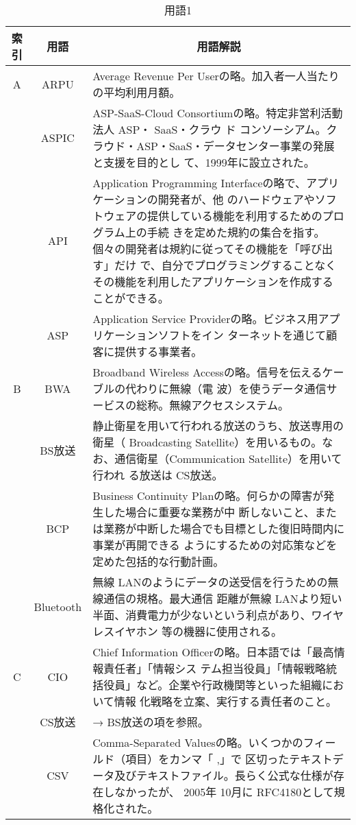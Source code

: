 \begin{table}[htb]
  \begin{center}
    \caption{用語1}
    \begin{tabular}{|c|c|p{12cm}|}
      \hline
      索引 & 用語 & \multicolumn{1}{c|}{用語解説} \\
      \hline
      A &  ARPU & Average Revenue Per Userの略。加入者一人当たりの平均利用月額。\\
      \cline{2-3}
      & ASPIC & ASP-SaaS-Cloud Consortiumの略。特定非営利活動法人 ASP・ SaaS・クラウ
      ド コンソーシアム。クラウド・ASP・SaaS・データセンター事業の発展と支援を目的とし
      て、1999年に設立された。 
      \\
      \cline{2-3}
      & API & Application Programming Interfaceの略で、アプリケーションの開発者が、他
      のハードウェアやソフトウェアの提供している機能を利用するためのプログラム上の手続
      きを定めた規約の集合を指す。個々の開発者は規約に従ってその機能を「呼び出す」だけ
      で、自分でプログラミングすることなくその機能を利用したアプリケーションを作成する
      ことができる。 \\
      \cline{2-3}
      & ASP & Application Service Providerの略。ビジネス用アプリケーションソフトをイン
      ターネットを通じて顧客に提供する事業者。 \\
      \hline
      B & BWA & Broadband Wireless Accessの略。信号を伝えるケーブルの代わりに無線（電
        波）を使うデータ通信サービスの総称。無線アクセスシステム。 \\
      \cline{2-3}
      & BS放送 & 静止衛星を用いて行われる放送のうち、放送専用の衛星（ Broadcasting
        Satellite）を用いるもの。なお、通信衛星（Communication Satellite）を用いて行われ
      る放送は CS放送。\\ 
      \cline{2-3}
      & BCP & Business Continuity Planの略。何らかの障害が発生した場合に重要な業務が中
      断しないこと、または業務が中断した場合でも目標とした復旧時間内に事業が再開できる
      ようにするための対応策などを定めた包括的な行動計画。 \\
      \cline{2-3}
      & Bluetooth & 無線 LANのようにデータの送受信を行うための無線通信の規格。最大通信
      距離が無線 LANより短い半面、消費電力が少ないという利点があり、ワイヤレスイヤホン
      等の機器に使用される。 \\
      \hline
      C &  CIO & Chief Information Officerの略。日本語では「最高情報責任者」「情報シス
        テム担当役員」「情報戦略統括役員」など。企業や行政機関等といった組織において情報
      化戦略を立案、実行する責任者のこと。 \\
      \cline{2-3}
      & CS放送 & → BS放送の項を参照。\\
      \cline{2-3}
      & CSV & Comma-Separated Valuesの略。いくつかのフィールド（項目）をカンマ「 ,」で
      区切ったテキストデータ及びテキストファイル。長らく公式な仕様が存在しなかったが、
      2005年 10月に RFC4180として規格化された。 \\
      \hline
    \end{tabular}
  \end{center}
\end{table}

